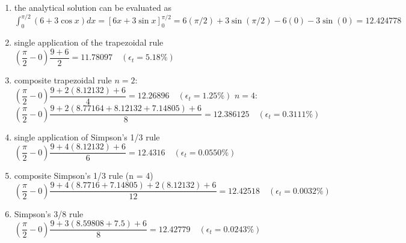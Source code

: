 \documentclass[../main.tex]{subfiles}
\begin{document}
\section{}
\begin{enumerate}[label=\bfseries(\alph*)]
\item the analytical solution can be evaluated as
	\bigbreak
$\displaystyle\int_{0}^{\pi / 2}(6+3 \cos x) d x=[6 x+3 \sin x]_{0}^{\pi / 2}=6(\pi / 2)+3 \sin (\pi / 2)-6(0)-3 \sin (0)=12.424778$
	\bigbreak

\item single application of the trapezoidal rule
	\bigbreak
$\left(\dfrac{\pi}{2}-0\right) \dfrac{9+6}{2}=11.78097 \quad\left(\epsilon_{t}=5.18 \%\right)$
	\bigbreak

\item composite trapezoidal rule
	\bigbreak
$n=2:$
	\bigbreak
$\left(\dfrac{\pi}{2}-0\right) \dfrac{9+2(8.12132)+6}{4}=12.26896 \quad\left(\epsilon_{t}=1.25 \%\right)$
	\bigbreak
$n=4:$
	\bigbreak
$\left(\dfrac{\pi}{2}-0\right) \dfrac{9+2(8.77164+8.12132+7.14805)+6}{8}=12.386125 \quad\left(\epsilon_{t}=0.3111 \%\right)$

\item single application of Simpson’s 1/3 rule
	\bigbreak
$\left(\dfrac{\pi}{2}-0\right) \dfrac{9+4(8.12132)+6}{6}=12.4316 \quad\left(\epsilon_{t}=0.0550 \%\right)$
	\bigbreak

\item composite Simpson’s 1/3 rule (n = 4)
	\bigbreak
$\left(\dfrac{\pi}{2}-0\right) \dfrac{9+4(8.7716+7.14805)+2(8.12132)+6}{12}=12.42518 \quad\left(\epsilon_{t}=0.0032 \%\right)$
	\bigbreak

\item Simpson’s 3/8 rule
	\bigbreak
$\left(\dfrac{\pi}{2}-0\right) \dfrac{9+3(8.59808+7.5)+6}{8}=12.42779 \quad\left(\epsilon_{t}=0.0243 \%\right)$
	\bigbreak 
\end{enumerate}
\end{document}
